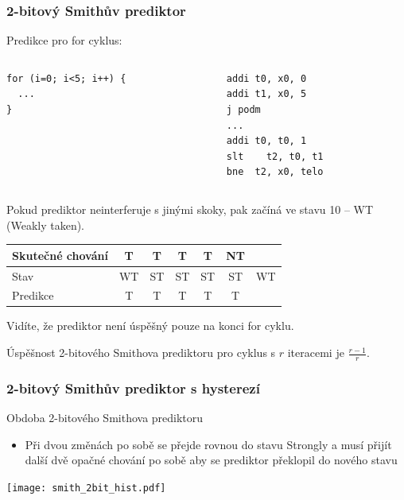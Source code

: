 \documentclass{beamer}
\begin{document}
\begin{frame}[fragile]
\frametitle{2-bitový Smithův prediktor}

Predikce pro for cyklus:

\begin{columns}[T]
\begin{column}{0.4\textwidth}
\begin{verbatim}
for (i=0; i<5; i++) {
  ...
}
\end{verbatim}
\end{column}
\hfill
\begin{column}{0.4\textwidth}
\begin{verbatim}
addi t0, x0, 0
addi t1, x0, 5
j podm
...
addi t0, t0, 1
slt    t2, t0, t1
bne  t2, x0, telo
\end{verbatim}
\end{column}
\end{columns}
\bigskip
\small
Pokud prediktor neinterferuje s jinými skoky, pak začíná ve stavu 10 -- WT (Weakly taken).

\begin{tabular}{|l|c|c|c|c|c|c|}\hline
Skutečné chování & T & T & T & T & NT &\\ \hline
Stav & WT & ST & ST & ST & ST & WT\\ \hline
Predikce         & T & T & T & T & {\color{red}T} &\\ \hline
\end{tabular}

Vidíte, že prediktor není úspěšný pouze na konci for cyklu.

Úspěšnost 2-bitového Smithova prediktoru pro cyklus s $r$ iteracemi je $\frac{r-1}{r}$.
\end{frame}


\begin{frame}
\frametitle{2-bitový Smithův prediktor s hysterezí}

Obdoba 2-bitového Smithova prediktoru
\begin{itemize}
\item Při dvou změnách po sobě se přejde rovnou do stavu Strongly a musí přijít další dvě opačné chování po sobě aby se prediktor překlopil do nového stavu
\end{itemize}

\begin{center}
\texttt{[image: smith\_2bit\_hist.pdf]}
\end{center}
\end{frame}
\end{document}
